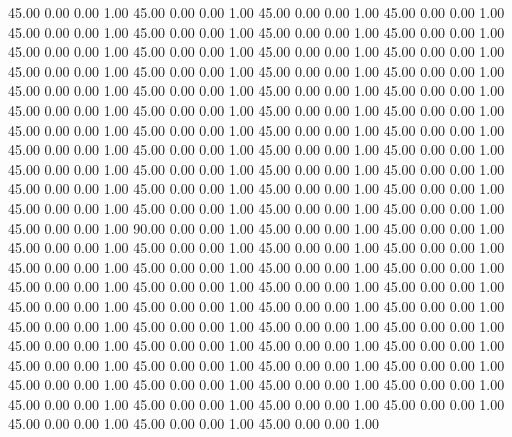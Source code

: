    45.00   0.00   0.00   1.00
   45.00   0.00   0.00   1.00
   45.00   0.00   0.00   1.00
   45.00   0.00   0.00   1.00
   45.00   0.00   0.00   1.00
   45.00   0.00   0.00   1.00
   45.00   0.00   0.00   1.00
   45.00   0.00   0.00   1.00
   45.00   0.00   0.00   1.00
   45.00   0.00   0.00   1.00
   45.00   0.00   0.00   1.00
   45.00   0.00   0.00   1.00
   45.00   0.00   0.00   1.00
   45.00   0.00   0.00   1.00
   45.00   0.00   0.00   1.00
   45.00   0.00   0.00   1.00
   45.00   0.00   0.00   1.00
   45.00   0.00   0.00   1.00
   45.00   0.00   0.00   1.00
   45.00   0.00   0.00   1.00
   45.00   0.00   0.00   1.00
   45.00   0.00   0.00   1.00
   45.00   0.00   0.00   1.00
   45.00   0.00   0.00   1.00
   45.00   0.00   0.00   1.00
   45.00   0.00   0.00   1.00
   45.00   0.00   0.00   1.00
   45.00   0.00   0.00   1.00
   45.00   0.00   0.00   1.00
   45.00   0.00   0.00   1.00
   45.00   0.00   0.00   1.00
   45.00   0.00   0.00   1.00
   45.00   0.00   0.00   1.00
   45.00   0.00   0.00   1.00
   45.00   0.00   0.00   1.00
   45.00   0.00   0.00   1.00
   45.00   0.00   0.00   1.00
   45.00   0.00   0.00   1.00
   45.00   0.00   0.00   1.00
   45.00   0.00   0.00   1.00
   45.00   0.00   0.00   1.00
   45.00   0.00   0.00   1.00
   45.00   0.00   0.00   1.00
   45.00   0.00   0.00   1.00
   45.00   0.00   0.00   1.00
   90.00   0.00   0.00   1.00
   45.00   0.00   0.00   1.00
   45.00   0.00   0.00   1.00
   45.00   0.00   0.00   1.00
   45.00   0.00   0.00   1.00
   45.00   0.00   0.00   1.00
   45.00   0.00   0.00   1.00
   45.00   0.00   0.00   1.00
   45.00   0.00   0.00   1.00
   45.00   0.00   0.00   1.00
   45.00   0.00   0.00   1.00
   45.00   0.00   0.00   1.00
   45.00   0.00   0.00   1.00
   45.00   0.00   0.00   1.00
   45.00   0.00   0.00   1.00
   45.00   0.00   0.00   1.00
   45.00   0.00   0.00   1.00
   45.00   0.00   0.00   1.00
   45.00   0.00   0.00   1.00
   45.00   0.00   0.00   1.00
   45.00   0.00   0.00   1.00
   45.00   0.00   0.00   1.00
   45.00   0.00   0.00   1.00
   45.00   0.00   0.00   1.00
   45.00   0.00   0.00   1.00
   45.00   0.00   0.00   1.00
   45.00   0.00   0.00   1.00
   45.00   0.00   0.00   1.00
   45.00   0.00   0.00   1.00
   45.00   0.00   0.00   1.00
   45.00   0.00   0.00   1.00
   45.00   0.00   0.00   1.00
   45.00   0.00   0.00   1.00
   45.00   0.00   0.00   1.00
   45.00   0.00   0.00   1.00
   45.00   0.00   0.00   1.00
   45.00   0.00   0.00   1.00
   45.00   0.00   0.00   1.00
   45.00   0.00   0.00   1.00
   45.00   0.00   0.00   1.00
   45.00   0.00   0.00   1.00
   45.00   0.00   0.00   1.00
